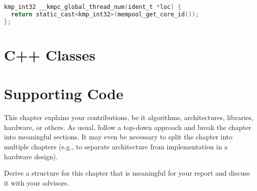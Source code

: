 \begin{lstlisting}[language=C, caption={__kmpc_global_thread_num}, label={lst:kmpc-global-thread-num},
                   escapechar=@]
kmp_int32 __kmpc_global_thread_num(ident_t *loc) {
  return static_cast<kmp_int32>(mempool_get_core_id());
};
\end{lstlisting}

\section{C++ Classes}
\label{sec:cpp-classes}

\section{Supporting Code}
\label{sec:supporting-code}

{\color{red}
	This chapter explains your contributions, be it algorithms, architectures, libraries, hardware, or others.
	As usual, follow a top-down approach and break the chapter into meaningful sections.
	It may even be necessary to split the chapter into multiple chapters (e.g., to separate architecture from implementation in a hardware design).

	Derive a structure for this chapter that is meaningful for your report and discuss it with your advisors.
}
